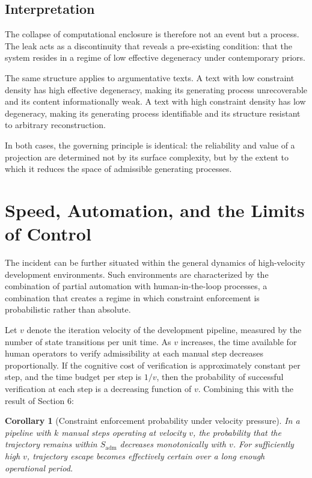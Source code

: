 \documentclass[12pt, oneside]{article}
\theoremstyle{plain}
\newtheorem{corollary}[theorem]{Corollary}
\theoremstyle{definition}
\theoremstyle{remark}
\begin{document}
\subsection{Interpretation}

The collapse of computational enclosure is therefore not an event but a process. The
leak acts as a discontinuity that reveals a pre-existing condition: that the system
resides in a regime of low effective degeneracy under contemporary priors.

The same structure applies to argumentative texts. A text with low constraint density
has high effective degeneracy, making its generating process unrecoverable and its
content informationally weak. A text with high constraint density has low degeneracy,
making its generating process identifiable and its structure resistant to arbitrary
reconstruction.

In both cases, the governing principle is identical: the reliability and value of a
projection are determined not by its surface complexity, but by the extent to which
it reduces the space of admissible generating processes.

\section{Speed, Automation, and the Limits of Control}

The incident can be further situated within the general dynamics of high-velocity development
environments. Such environments are characterized by the combination of partial automation
with human-in-the-loop processes, a combination that creates a regime in which constraint
enforcement is probabilistic rather than absolute.

Let $v$ denote the iteration velocity of the development pipeline, measured by the number
of state transitions per unit time. As $v$ increases, the time available for human
operators to verify admissibility at each manual step decreases proportionally. If the
cognitive cost of verification is approximately constant per step, and the time budget per
step is $1/v$, then the probability of successful verification at each step is a decreasing
function of $v$. Combining this with the result of Section 6:

\begin{corollary}[Constraint enforcement probability under velocity pressure]
In a pipeline with $k$ manual steps operating at velocity $v$, the probability that the
trajectory remains within $S_{\text{adm}}$ decreases monotonically with $v$. For sufficiently
high $v$, trajectory escape becomes effectively certain over a long enough operational period.
\end{corollary}
\end{document}
